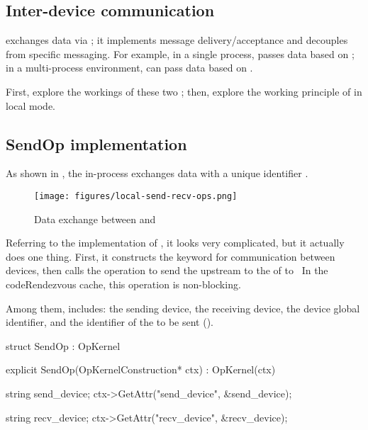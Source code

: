 \begin{content}
\section{Inter-device communication}

 exchanges data via ; it implements message delivery/acceptance and decouples from specific messaging. For example, in a single process,  passes data based on ; in a multi-process environment,  can pass data based on .

First, explore the workings of these two ; then, explore the working principle of  in local mode.

\subsection{SendOp implementation}

As shown in , the in-process  exchanges data with a unique identifier .

\begin{figure}[H]
\centering
\texttt{[image: figures/local-send-recv-ops.png]}
\caption{Data exchange between  and }
 \label{fig:local-send-recv-ops}
\end{figure}

Referring to the  implementation of , it looks very complicated, but it actually does one thing. First, it constructs the keyword  for communication between devices, then calls the  operation to send the upstream  to the  of  to \ In the code{Rendezvous} cache, this operation is non-blocking.

Among them,  includes: the sending device, the receiving device, the device global identifier, and the identifier of the  to be sent ().

\begin{leftbar}
\begin{c++}
struct SendOp : OpKernel {
  explicit SendOp(OpKernelConstruction* ctx) : OpKernel(ctx) {
    string send_device;
    ctx->GetAttr("send_device", &send_device);

    string recv_device;
    ctx->GetAttr("recv_device", &recv_device);

}}
\end{c++}
\end{leftbar}
\end{content}

